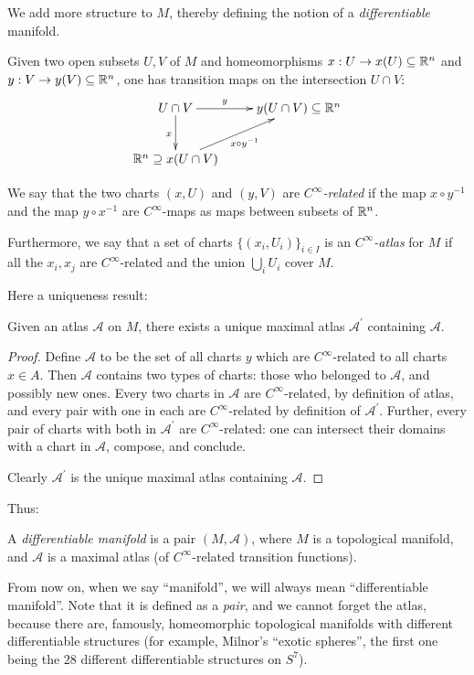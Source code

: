 \documentclass[11pt, english]{article}
\begin{document}
We add more structure to $M$, thereby defining the notion of a \emph{differentiable} manifold.

Given two open subsets $U,V$ of $M$ and homeomorphisms $x:U \to x(U) \subseteq \mathbb{R}^n$ and $y:V \to y(V) \subseteq \mathbb{R}^n$, one has transition maps on the intersection $U \cap V$:
\[
\xymatrix{
 U \cap V \ar[d]_x \ar[r]^-y & y(U \cap V)  \subseteq \R^n \\
\R^n \supseteq  x(U \cap V) \ar[ur]_{x \circ y^{-1}}
}
\]

We say that the two charts $(x,U)$ and $(y,V)$ are \emph{$C^\infty$-related} if the map $x \circ y^{-1}$ and the map $y \circ x^{-1}$ are $C^\infty$-maps as maps between subsets of $\mathbb{R}^n$.

Furthermore, we say that a set of charts $\{ (x_i, U_i)\}_{i \in I}$ is an \emph{$C^\infty$-atlas} for $M$ if all the $x_i,x_j$ are $C^\infty$-related and the union $\bigcup_i U_i$ cover $M$.

Here a uniqueness result:

\begin{lemma}
Given an atlas $\mathscr{A}$ on $M$, there exists a unique maximal atlas $\mathscr{A}^\prime$ containing $\mathscr A$.
\end{lemma}
\begin{proof}
Define $\mathscr A$ to be the set of all charts $y$ which are $C^\infty$-related to all charts $x \in A$. Then $\mathscr A$ contains two types of charts: those who belonged to $\mathscr A$, and possibly new ones. Every two charts in $\mathscr A$ are $C^\infty$-related, by definition of atlas, and every pair with one in each are $C^\infty$-related by definition of $\mathscr A^\prime$. Further, every pair of charts with both in $\mathscr A^\prime$ are $C^\infty$-related: one can intersect their domains with a chart in $\mathscr A$, compose, and conclude.

Clearly $\mathscr A^\prime$ is the unique maximal atlas containing $\mathscr A$.
\end{proof}

Thus:

\begin{defi}
A \emph{differentiable manifold} is a pair $(M,\mathscr A)$, where $M$ is a topological manifold, and $\mathscr A$ is a maximal atlas (of $C^\infty$-related transition functions).
\end{defi}

From now on, when we say ``manifold'', we will always mean ``differentiable manifold''. Note that it is defined as a \emph{pair}, and we cannot forget the atlas, because there are, famously, homeomorphic topological manifolds with different differentiable structures (for example, Milnor's ``exotic spheres'', the first one being the $28$ different differentiable structures on $S^7$).
\end{document}

